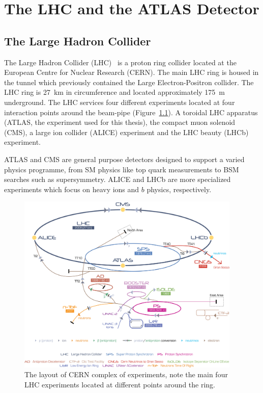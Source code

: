 \newcommand{\rphi}{\ensuremath{R-\phi}}
\newcommand{\T}{\ensuremath{\mathbf{T}}}
\newcommand{\Tms}{\ensuremath{\T_{\textrm{MS}}}}
\newcommand{\Tid}{\ensuremath{\T_{\textrm{ID}}}}
\newcommand{\C}{\ensuremath{\mathbf{C}}}
\newcommand{\Cms}{\ensuremath{\C_{\textrm{MS}}}}
\newcommand{\Cid}{\ensuremath{\C_{\textrm{ID}}}}

\chapter{The LHC and the ATLAS Detector} \label{sec:lhc_atlas_detector}

\section{The Large Hadron Collider} \label{sec:the_large_hadron_collider}

The Large Hadron Collider (LHC)~\cite{LHC} is a proton ring collider located at the European Centre for Nuclear Research (CERN). The main LHC ring is housed in the tunnel which previously contained the Large Electron-Positron collider. The LHC ring is \SI{27}{\kilo\meter} in circumference and located approximately \SI{175}{\meter} underground. The LHC services four different experiments located at four interaction points around the beam-pipe (Figure~\ref{fig:DetectorLHCLayout}). A toroidal LHC apparatus (ATLAS, the experiment used for this thesis), the compact muon solenoid (CMS), a large ion collider (ALICE) experiment and the LHC beauty (LHCb) experiment. 

ATLAS and CMS are general purpose detectors designed to support a varied physics programme, from SM physics like top quark measurements to BSM searches such as supersymmetry. ALICE and LHCb are more specialized experiments which focus on heavy ions and $b$ physics, respectively.

\begin{figure}[htbp]
  \centering
  \includegraphics[width=0.95\textwidth]{PartDetector/Diagrams/Cern-Accelerator-Complex.jpg}
  \caption{The layout of CERN complex of experiments, note the main four LHC experiments located at different points around the ring.}
  \label{fig:DetectorLHCLayout}
\end{figure}

